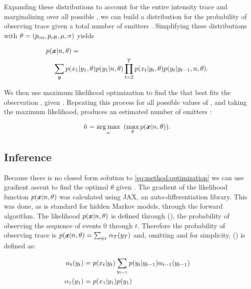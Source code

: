 Expanding these distributions to account for the entire intensity trace \trace and marginalizing over all possible \states, we can build a distribution for the probability of observing trace \trace given a total number of emitters \n. Simplifying these distributions with $\theta = (p_\text{on}, p_\text{off}, \mu, \sigma)$ yields

\begin{align*}
  p(\bm{x}|n,\theta) &=\\
    \sum_{\bm{y}}
      p(&x_{1}|y_{1}, \theta)
      p(y_{1}|n, \theta)
      \prod_{t=2}^{T}
        p(x_{t}|y_{t}, \theta)
        p(y_{t}|y_{t-1},n, \theta)
  \label{eq:method:likelihood}
  \text{.}
\end{align*}

We then use maximum likelihood optimization to find the \parameters that best fits the observation \trace, given \n. 
Repeating this process for all possible values of \n, and taking the maximum likelihood, produces an estimated number of emitters \estimatedn:

\begin{equation}
    \hat{n} =
    \mathop{\arg\max}_{n}\hspace{0.5em} (
    \max_\theta
    p(\bm{x}|n,\theta))
  \text{.}
  \label{eq:method:optimization}
\end{equation}

\subsection{Inference}

Because there is no closed form solution to  \eqref{eq:method:optimization} we can use gradient ascent to find the optimal $\theta$ given \n.
The gradient of the likelihood function $p(\bm{x} | n, \theta)$ was calculated using JAX, an auto-differentiation library.
This was done, as is standard for hidden Markov models, through the forward algorithm.
The likelihood $p(\bm{x} | n, \theta)$ is defined through \pchain(), the probability of observing the sequence of events 0 through $t$.
Therefore the probability of observing trace \trace is $ p(\bm{x}|n,\theta) = \sum_{y_{T}} \alpha_T(y_{T})$ and, omitting \n and \parameters for simplicity, \pchain()  is defined as:

\begin{align*}
  \alpha_{t}(y_{t}) &= p(x_{t}|y_{t}) \sum_{y_{t-1}} p(y_{t} | y_{t-1}) \alpha_{t-1}(y_{t-1}) \\
  \alpha_{1}(y_{1}) &= p(x_{1}|y_{1}) p(y_{1})
\end{align*}

